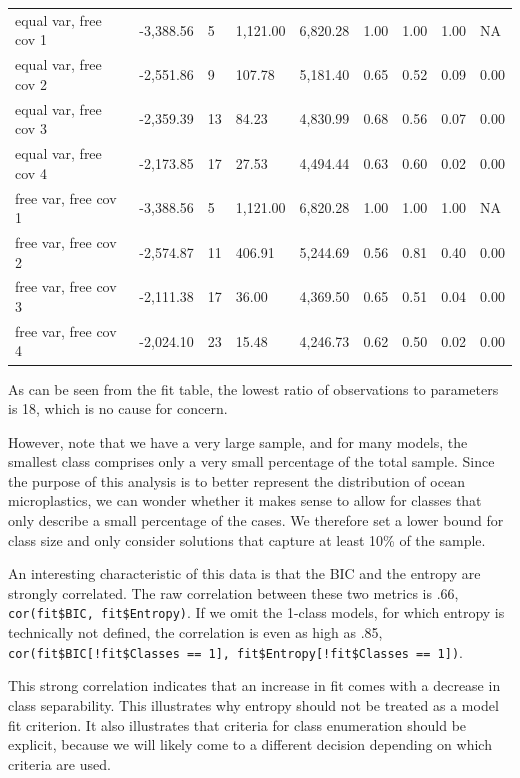\documentclass[
  man,floatsintext]{apa6}
\begin{document}
\begin{table}[tbp]
\begin{center}
\begin{threeparttable}
\begin{tabular}{lllllllll}
equal var, free cov 1 & -3,388.56 & 5 & 1,121.00 & 6,820.28 & 1.00 & 1.00 & 1.00 & NA\\
equal var, free cov 2 & -2,551.86 & 9 & 107.78 & 5,181.40 & 0.65 & 0.52 & 0.09 & 0.00\\
equal var, free cov 3 & -2,359.39 & 13 & 84.23 & 4,830.99 & 0.68 & 0.56 & 0.07 & 0.00\\
equal var, free cov 4 & -2,173.85 & 17 & 27.53 & 4,494.44 & 0.63 & 0.60 & 0.02 & 0.00\\
free var, free cov 1 & -3,388.56 & 5 & 1,121.00 & 6,820.28 & 1.00 & 1.00 & 1.00 & NA\\
free var, free cov 2 & -2,574.87 & 11 & 406.91 & 5,244.69 & 0.56 & 0.81 & 0.40 & 0.00\\
free var, free cov 3 & -2,111.38 & 17 & 36.00 & 4,369.50 & 0.65 & 0.51 & 0.04 & 0.00\\
free var, free cov 4 & -2,024.10 & 23 & 15.48 & 4,246.73 & 0.62 & 0.50 & 0.02 & 0.00\\
\bottomrule
\end{tabular}

\end{threeparttable}
\end{center}

\end{table}

As can be seen from the fit table, the lowest ratio of observations to parameters is 18, which is no cause for concern.

However, note that we have a very large sample, and for many models, the smallest class comprises only a very small percentage of the total sample.
Since the purpose of this analysis is to better represent the distribution of ocean microplastics, we can wonder whether it makes sense to allow for classes that only describe a small percentage of the cases.
We therefore set a lower bound for class size and only consider solutions that capture at least 10\% of the sample.

An interesting characteristic of this data is that the BIC and the entropy are strongly correlated.
The raw correlation between these two metrics is .66, \texttt{cor(fit\$BIC,\ fit\$Entropy)}.
If we omit the 1-class models, for which entropy is technically not defined, the correlation is even as high as .85, \texttt{cor(fit\$BIC{[}!fit\$Classes\ ==\ 1{]},\ fit\$Entropy{[}!fit\$Classes\ ==\ 1{]})}.

This strong correlation indicates that an increase in fit comes with a decrease in class separability.
This illustrates why entropy should not be treated as a model fit criterion.
It also illustrates that criteria for class enumeration should be explicit, because we will likely come to a different decision depending on which criteria are used.
\end{document}
